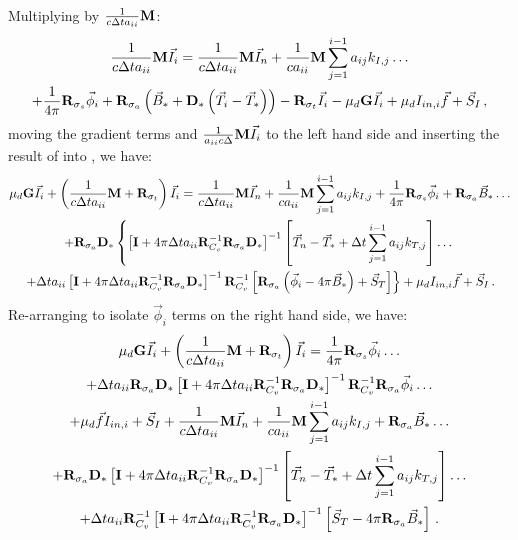 %
Multiplying  by $\frac{1}{c\Delta t a_{ii}} \mathbf M$:
\begin{multline}
\frac{1}{c\Delta t a_{ii}} \mathbf M\vec{I}_i = \frac{1}{c\Delta t a_{ii}} \mathbf M\vec{I}_n + \frac{1}{c a_{ii}}  \mathbf M \sum_{j=1}^{i-1}{a_{ij} k_{I,j}   } \dots \\
+ 
\frac{1}{4\pi}\mathbf{R}_{\sigma_s}\vec{\phi}_i + 
\mathbf{R}_{\sigma_a}\left(\vec{B}_* +  \mathbf{D}_* \left(\vec{T}_i -\vec{T}_*  \right)   \right)- \mathbf{R}_{\sigma_t} \vec{I}_i - \mu_d\mathbf{G}\vec{I}_i + \mu_d I_{in,i} \vec{f}+ \vec{S}_I \, ,
\label{eq:kIi_second}
\end{multline}
%
%
moving the gradient terms and $\frac{1}{a_{ii} c \Delta }  \mathbf M \vec{I}_i$ to the left hand side and inserting the result of  into , we have:
%
%
\begin{multline}
\mu_d \mathbf{G} \vec{I}_i + \left( \frac{1}{c\Delta t a_{ii}} \mathbf M + \mathbf{R}_{\sigma_t} \right) \vec{I}_i = 
\frac{1}{c\Delta t a_{ii}} \mathbf M\vec{I}_n + \frac{1}{c a_{ii}}  \mathbf M \sum_{j=1}^{i-1}{a_{ij} k_{I,j}   } 
+ \frac{1}{4\pi}\mathbf{R}_{\sigma_s}\vec{\phi}_i 
+ \mathbf{R}_{\sigma_a}\vec{B}_* \dots \\ 
+ \mathbf{R}_{\sigma_a}  \mathbf{D}_*  \left \{
\left[ \mathbf{I}  + 4\pi \Delta t a_{ii}\mathbf{R}_{C_v}^{-1}\mathbf{R}_{\sigma_a} \mathbf{D}_*   \right]^{-1}
\left[\vec{T}_n -\vec{T}_* + \Delta t \sum_{j=1}^{i-1}{a_{ij} k_{T,j}   }\right]   \dots \right.  \\
\left.
+ \Delta t a_{ii}\left[ \mathbf{I} + 4\pi \Delta t a_{ii}\mathbf{R}_{C_v}^{-1} \mathbf{R}_{\sigma_a} \mathbf{D}_*   \right]^{-1} 
\mathbf{R}_{C_v}^{-1}\left[\mathbf{R}_{\sigma_a} \left(\vec{\phi}_i - 4\pi \vec{B}_*  \right) + \vec{S}_T \right]  \right \} + \mu_d I_{in,i} \vec{f} + \vec{S}_I \, .
\label{eq:intensity_stage_i_intermediate}
\end{multline}
%
%
Re-arranging  to isolate $\vec{\phi}_i$ terms on the right hand side, we have:
%
%
\begin{multline}
\mu_d \mathbf{G} \vec{I}_i + \left( \frac{1}{c\Delta t a_{ii}}\M + \R{\sigma_t} \right) \vec{I}_i =  \frac{1}{4\pi}\R{\sigma_s}\vec{\phi}_i \dots \\
%
%
+  \Delta t a_{ii} \R{\sigma_a} \D
\left[\I + 4\pi \Delta t a_{ii}\R{C_v}^{-1} \R{\sigma_a}\D  \right]^{-1}\R{C_v}^{-1}\R{\sigma_a}\vec{\phi}_i\dots \\
%
%
+ \mu_d \vec{f}I_{in,i} + \vec{S}_I +  \frac{1}{c\Delta t a_{ii}}\M\vec{I}_n + \frac{1}{c a_{ii}} \M \sum_{j=1}^{i-1}{a_{ij} k_{I,j}   } + \R{\sigma_a}\vec{B}_* \dots \\
%
%
+ \R{\sigma_a} \D
\left[\I+ 4\pi \Delta t a_{ii}\R{C_v}^{-1}\R{\sigma_a} \D\right]^{-1}
\left[ \vec{T}_n - \vec{T}_* + \Delta t \sum_{j=1}^{i-1}{a_{ij} k_{T,j}  }\right] \dots \\
  +\Delta t a_{ii}  \R{C_v}^{-1} \left[\I+ 4\pi \Delta t a_{ii}\R{C_v}^{-1}\R{\sigma_a} \D\right]^{-1} \left[\vec{S}_T - 4\pi\R{\sigma_a} \vec{B}_* \right] \pep
\end{multline}
